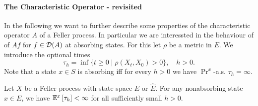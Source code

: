\documentclass[../Master.tex]{subfiles}
\begin{document}
\paragraph{The Characteristic Operator - revisited}
In the following we want to further describe some properties of the characteristic operator \(A\) of a Feller process. In particular we are interessted in the behaviour of of \(A f\) for \(f \in \mathcal{D}(A)\) at absorbing states. For this let \(\rho{}\) be a metric in \(E\). We introduce the optional times
\begin{equation}
  \tau_h = \inf \{t \ge 0 \mid \rho(X_t, X_0) > 0\}, \quad h > 0.
\end{equation}
Note that a state \(x \in S\) is absorbing iff for every \(h > 0\) we have \(\Pr^x\)-a.s. \(\tau_h = \infty{}\).

\begin{lemma}
  Let \(X\) be a Feller process with state space \(E\) or \(\hat{E}\). For any nonabsorbing state \(x \in E\), we have \(\mathbb{E}^x \left[\tau_h\right] < \infty{}\) for all sufficiently small \(h > 0\).
\end{lemma}
\end{document}
